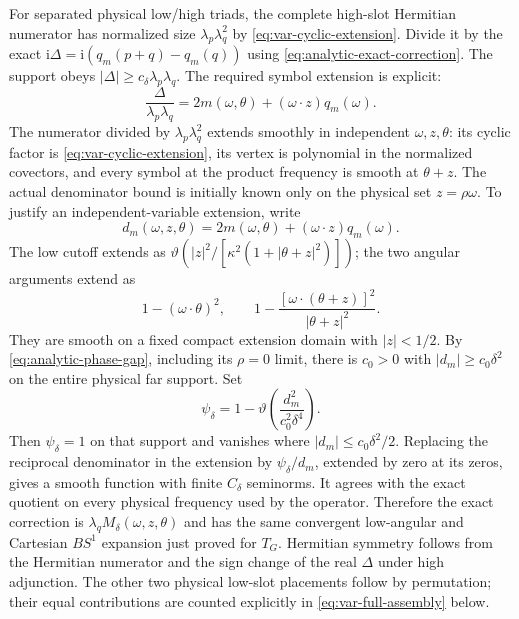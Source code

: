 \documentclass[11pt,a4paper]{article}
\numberwithin{equation}{section}
\newcommand{\f}[2]{\frac{#1}{#2}}
\newcommand{\ii}{\mathrm{i}}
\theoremstyle{definition}
\begin{document}
For separated physical low/high triads, the complete high-slot
Hermitian numerator has normalized size $\lambda_p\lambda_q^2$ by
\eqref{eq:var-cyclic-extension}. Divide it by the exact
$\ii \Delta=\ii(q_m(p+q)-q_m(q))$ using
\eqref{eq:analytic-exact-correction}. The support obeys
$|\Delta|\geq c_\delta \lambda_p\lambda_q$. The required symbol extension is explicit:
\begin{equation*}
\f\Delta{\lambda_p\lambda_q}
=2m(\omega,\theta)+(\omega\cdot z)q_m(\omega).
\end{equation*}
The numerator divided by $\lambda_p\lambda_q^2$ extends smoothly in independent
$\omega,z,\theta$: its cyclic factor is
\eqref{eq:var-cyclic-extension}, its vertex is polynomial in the
normalized covectors, and every symbol at the product frequency is smooth at
$\theta+z$. The actual denominator bound is initially known only on
the physical set $z=\rho\omega$. To justify an independent-variable
extension, write
\begin{equation*}
d_m(\omega,z,\theta)
=2m(\omega,\theta)+(\omega\cdot z)q_m(\omega).
\end{equation*}
The low cutoff extends as
$\vartheta(|z|^2/[\kappa^2(1+|\theta+z|^2)])$; the two angular
arguments extend as
\begin{equation*}
1-(\omega\cdot\theta)^2,\qquad
1-\f{[\omega\cdot(\theta+z)]^2}{|\theta+z|^2}.
\end{equation*}
They are smooth on a fixed compact extension domain with $|z|<1/2$.
By \eqref{eq:analytic-phase-gap}, including its $\rho=0$ limit, there
is $c_0>0$ with $|d_m|\geq c_0\delta^2$ on the entire physical far
support. Set
\begin{equation*}
\psi_\delta=1-\vartheta\!\left(\f{d_m^2}{c_0^2\delta^4}\right).
\end{equation*}
Then $\psi_\delta=1$ on that support and vanishes where
$|d_m|\leq c_0\delta^2/2$. Replacing the reciprocal denominator in
the extension by $\psi_\delta/d_m$, extended by zero at its zeros,
gives a smooth function with finite $C_\delta$ seminorms. It agrees
with the exact quotient on every physical frequency used by the
operator. Therefore the exact correction is
$\lambda_q M_\delta(\omega,z,\theta)$ and has the same convergent low-angular
and Cartesian $BS^1$ expansion just proved for $T_G$.
Hermitian symmetry follows from the Hermitian numerator and the sign
change of the real $\Delta$ under high adjunction. The other two physical
low-slot placements follow by permutation; their equal contributions
are counted explicitly in \eqref{eq:var-full-assembly} below.
\end{document}
